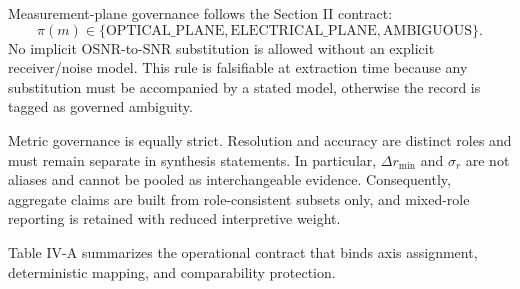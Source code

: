Measurement-plane governance follows the Section II contract:
\[
\pi(m) \in \{\text{OPTICAL\_PLANE}, \text{ELECTRICAL\_PLANE}, \text{AMBIGUOUS}\}.
\]
No implicit OSNR-to-SNR substitution is allowed without an explicit receiver/noise model. This rule is falsifiable at extraction time because any substitution must be accompanied by a stated model, otherwise the record is tagged as governed ambiguity.

Metric governance is equally strict. Resolution and accuracy are distinct roles and must remain separate in synthesis statements. In particular, $\Delta r_{\min}$ and $\sigma_r$ are not aliases and cannot be pooled as interchangeable evidence. Consequently, aggregate claims are built from role-consistent subsets only, and mixed-role reporting is retained with reduced interpretive weight.

Table IV-A summarizes the operational contract that binds axis assignment, deterministic mapping, and comparability protection.

